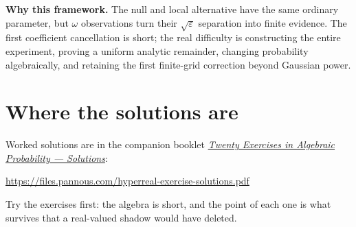 \documentclass[11pt]{article}
\newcommand{\eps}{\varepsilon}
\begin{document}
\textbf{Why this framework.} The null and local alternative have the same ordinary
parameter, but $\omega$ observations turn their $\sqrt{\eps}$ separation
into finite evidence. The first coefficient cancellation is short; the real
difficulty is constructing the entire experiment, proving a uniform analytic
remainder, changing probability algebraically, and retaining the first
finite-grid correction beyond Gaussian power.


\section*{Where the solutions are}

Worked solutions are in the companion booklet
\href{https://files.pannous.com/hyperreal-exercise-solutions.pdf}{\emph{Twenty Exercises in Algebraic Probability --- Solutions}}:
\begin{center}\small\url{https://files.pannous.com/hyperreal-exercise-solutions.pdf}\end{center}
Try the exercises first: the algebra is short, and the point of each one is
what survives that a real-valued shadow would have deleted.
\end{document}
